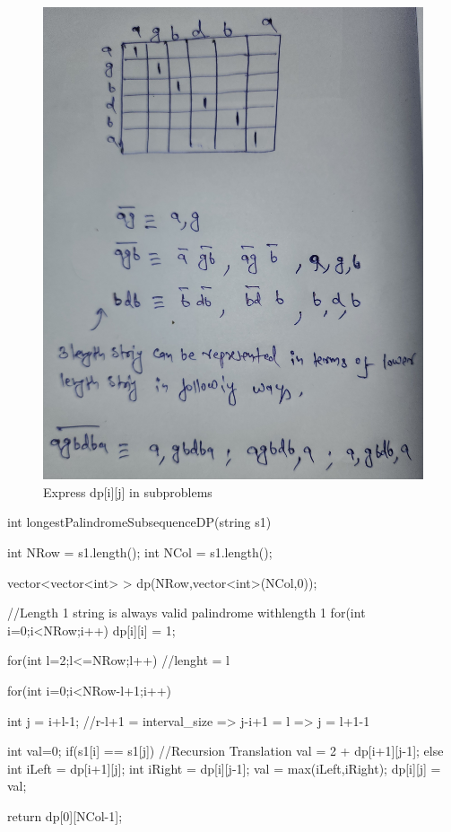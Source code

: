\begin{solution}[Iterative]
    \begin{figure}
        \centering
        \caption{Express dp[i][j] in subproblems}
        \includegraphics[width=\marginparwidth]{resources/LPS_Division2.jpg} 
    \end{figure}

    \begin{code}
        int longestPalindromeSubsequenceDP(string s1)
        {
            int NRow = s1.length();
            int NCol = s1.length();
        
            vector<vector<int> > dp(NRow,vector<int>(NCol,0));
        
            //Length 1 string is always valid palindrome withlength 1  
            for(int i=0;i<NRow;i++)
                dp[i][i] = 1;
        
            for(int l=2;l<=NRow;l++) //lenght = l
            {
                
                for(int i=0;i<NRow-l+1;i++) 
                {
                    int j = i+l-1; //r-l+1 = interval_size => j-i+1 = l => j = l+1-1
                        
                    int val=0;
                    if(s1[i] == s1[j]) //Recursion Translation
                    {
                        val = 2 + dp[i+1][j-1];
                    }
                    else
                    {
                        int iLeft = dp[i+1][j];
                        int iRight = dp[i][j-1];
                        val = max(iLeft,iRight);
                    }
                    dp[i][j] = val;
                }
            }      
            return dp[0][NCol-1];
        }
    \end{code}
\end{solution}


